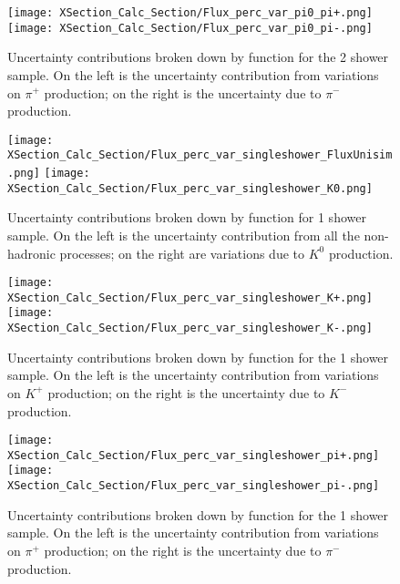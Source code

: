 \begin{figure}[H]
\centering
\texttt{[image: XSection\_Calc\_Section/Flux\_perc\_var\_pi0\_pi+.png]}
\texttt{[image: XSection\_Calc\_Section/Flux\_perc\_var\_pi0\_pi-.png]}
\caption{ Uncertainty contributions broken down by function for the 2 shower sample. On the left is the uncertainty contribution from variations on $\pi^+$ production; on the right is the uncertainty due to $\pi^-$ production. }
\label{fig:flux_2shower_unc_plots_2}
\end{figure}


\begin{figure}[H]
\centering
\texttt{[image: XSection\_Calc\_Section/Flux\_perc\_var\_singleshower\_FluxUnisim.png]}
\texttt{[image: XSection\_Calc\_Section/Flux\_perc\_var\_singleshower\_K0.png]}
\caption{ Uncertainty contributions broken down by function for 1 shower sample. On the left is the uncertainty contribution from all the non-hadronic processes; on the right are variations due to $K^0$ production. }
\label{fig:flux_1shower_unc_plots_0}
\end{figure}

\begin{figure}[H]
\centering
\texttt{[image: XSection\_Calc\_Section/Flux\_perc\_var\_singleshower\_K+.png]}
\texttt{[image: XSection\_Calc\_Section/Flux\_perc\_var\_singleshower\_K-.png]}
\caption{ Uncertainty contributions broken down by function for the 1 shower sample. On the left is the uncertainty contribution from variations on $K^+$ production; on the right is the uncertainty due to $K^-$ production. }
\label{fig:flux_1shower_unc_plots_1}
\end{figure}

\begin{figure}[H]
\centering
\texttt{[image: XSection\_Calc\_Section/Flux\_perc\_var\_singleshower\_pi+.png]}
\texttt{[image: XSection\_Calc\_Section/Flux\_perc\_var\_singleshower\_pi-.png]}
\caption{ Uncertainty contributions broken down by function for the 1 shower sample. On the left is the uncertainty contribution from variations on $\pi^+$ production; on the right is the uncertainty due to $\pi^-$ production. }
\label{fig:flux_1shower_unc_plots_2}
\end{figure}


